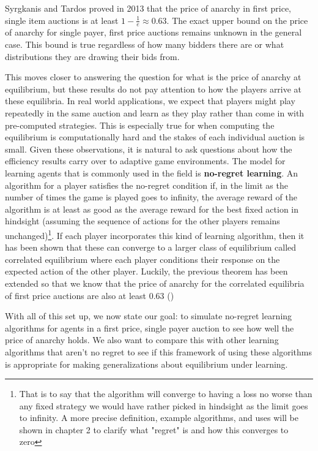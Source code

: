 \documentclass[12pt,twoside]{reedthesis}
\begin{document}
Syrgkanis and Tardos proved in 2013 that the price of anarchy in first price, single item auctions is at least $1 - \frac{1}{e} \approx 0.63$. The exact upper bound on the price of anarchy for single payer, first price auctions remains unknown in the general case. This bound is true regardless of how many bidders there are or what distributions they are drawing their bids from.

This moves closer to answering the question for what is the price of anarchy at equilibrium, but these results do not pay attention to how the players arrive at these equilibria. In real world applications, we expect that players might play repeatedly in the same auction and learn as they play rather than come in with pre-computed strategies. This is especially true for when computing the equilibrium is computationally hard and the stakes of each individual auction is small. Given these observations, it is natural to ask questions about how the efficiency results carry over to adaptive game environments. The model for learning agents that is commonly used in the field is \textbf{no-regret learning}. An algorithm for a player satisfies the no-regret condition if, in the limit as the number of times the game is played goes to infinity, the average reward of the algorithm is at least as good as the average reward for the best fixed action in hindsight (assuming the sequence of actions for the other players remains unchanged)\footnote{That is to say that the algorithm will converge to having a loss no worse than any fixed strategy we would have rather picked in hindsight as the limit goes to infinity. A more precise definition, example algorithms, and uses will be shown in chapter 2 to clarify what "regret" is and how this converges to zero}. If each player  incorporates this kind of learning algorithm, then it has been shown that these can converge to a larger class of equilibrium called correlated equilibrium where each player conditions their response on the expected action of the other player. Luckily, the previous theorem has been extended so that we know that the price of anarchy for the correlated equilibria of first price auctions are also at least 0.63 (\cite{Roughgarden2017})

With all of this set up, we now state our goal: to simulate no-regret learning algorithms for agents in a first price, single payer auction to see how well the price of anarchy holds. We also want to compare this with other learning algorithms that aren't no regret to see if this framework of using these algorithms is appropriate for making generalizations about equilibrium under learning.
\end{document}
